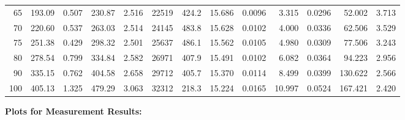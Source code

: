\documentclass[10pt]{article}
\begin{document}
{\begin{tabular}{|r|rr|rr|rr|rr|rr|r|r|}
       65 &       193.09 &        0.507 &       230.87 &        2.516 &        22519 &        424.2 &       15.686 &       0.0096 &        3.315 &       0.0296 &       52.002 &        3.713 \\
       70 &       220.60 &        0.537 &       263.03 &        2.514 &        24145 &        483.8 &       15.628 &       0.0102 &        4.000 &       0.0336 &       62.506 &        3.529 \\
       75 &       251.38 &        0.429 &       298.32 &        2.501 &        25637 &        486.1 &       15.562 &       0.0105 &        4.980 &       0.0309 &       77.506 &        3.243 \\
       80 &       278.54 &        0.799 &       334.84 &        2.582 &        26971 &        407.9 &       15.491 &       0.0102 &        6.082 &       0.0364 &       94.223 &        2.956 \\
       90 &       335.15 &        0.762 &       404.58 &        2.658 &        29712 &        405.7 &       15.370 &       0.0114 &        8.499 &       0.0399 &      130.622 &        2.566 \\
      100 &       405.13 &        1.325 &       479.29 &        3.063 &        32312 &        218.3 &       15.224 &       0.0165 &       10.997 &       0.0524 &      167.421 &        2.420 \\
\hline
\end{tabular}
}

\vspace{3mm}






\pagebreak
\noindent
{\large \bf Plots for Measurement Results:}
\vspace{5mm}
\end{document}
